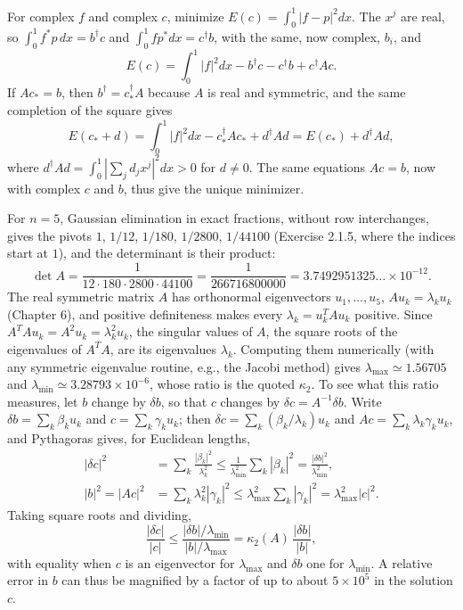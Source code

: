 For complex $f$ and complex $c$, minimize $E(c)=\int_0^1|f-p|^2dx$. The
$x^j$ are real, so $\int_0^1f^*p\,dx=b^\dagger c$ and
$\int_0^1fp^*dx=c^\dagger b$, with the same, now complex, $b_i$, and
\[
E(c)=\int_0^1|f|^2dx-b^\dagger c-c^\dagger b+c^\dagger Ac.
\]
If $Ac_*=b$, then $b^\dagger=c_*^\dagger A$ because $A$ is real and
symmetric, and the same completion of the square gives
\[
E(c_*+d)=\int_0^1|f|^2dx-c_*^\dagger Ac_*+d^\dagger Ad=E(c_*)+d^\dagger Ad,
\]
where $d^\dagger Ad=\int_0^1|\sum_jd_jx^j|^2dx>0$ for $d\ne0$. The same
equations $Ac=b$, now with complex $c$ and $b$, thus give the unique
minimizer.

For $n=5$, Gaussian elimination in exact fractions, without row
interchanges, gives the pivots $1$, $1/12$, $1/180$, $1/2800$, $1/44100$
(Exercise 2.1.5, where the indices start at $1$), and the determinant is
their product:
\[
\det A=\frac1{12\cdot180\cdot2800\cdot44100}=\frac1{266716800000}
=3.7492951325\ldots\times10^{-12}.
\]
The real symmetric matrix $A$ has orthonormal eigenvectors
$u_1,\ldots,u_5$, $Au_k=\lambda_ku_k$ (Chapter 6), and positive
definiteness makes every $\lambda_k=u_k^TAu_k$ positive. Since
$A^TAu_k=A^2u_k=\lambda_k^2u_k$, the singular values of $A$, the square
roots of the eigenvalues of $A^TA$, are its eigenvalues $\lambda_k$.
Computing them numerically (with any symmetric eigenvalue
routine, e.g., the Jacobi method) gives $\lambda_{\max}\simeq1.56705$ and
$\lambda_{\min}\simeq3.28793\times10^{-6}$, whose ratio is the quoted
$\kappa_2$. To see what this ratio measures, let $b$ change by $\delta b$,
so that $c$ changes by $\delta c=A^{-1}\delta b$. Write
$\delta b=\sum_k\beta_ku_k$ and $c=\sum_k\gamma_ku_k$; then
$\delta c=\sum_k(\beta_k/\lambda_k)u_k$ and $Ac=\sum_k\lambda_k\gamma_ku_k$,
and Pythagoras gives, for Euclidean lengths,
\begin{align*}
|\delta c|^2&=\sum_k\frac{|\beta_k|^2}{\lambda_k^2}
\le\frac1{\lambda_{\min}^2}\sum_k|\beta_k|^2
=\frac{|\delta b|^2}{\lambda_{\min}^2},\\
|b|^2=|Ac|^2&=\sum_k\lambda_k^2|\gamma_k|^2
\le\lambda_{\max}^2\sum_k|\gamma_k|^2=\lambda_{\max}^2|c|^2.
\end{align*}
Taking square roots and dividing,
\[
\frac{|\delta c|}{|c|}\le\frac{|\delta b|/\lambda_{\min}}{|b|/\lambda_{\max}}
=\kappa_2(A)\,\frac{|\delta b|}{|b|},
\]
with equality when $c$ is an eigenvector for $\lambda_{\max}$ and
$\delta b$ one for $\lambda_{\min}$. A relative error in $b$ can thus be
magnified by a factor of up to about $5\times10^5$ in the solution $c$.

